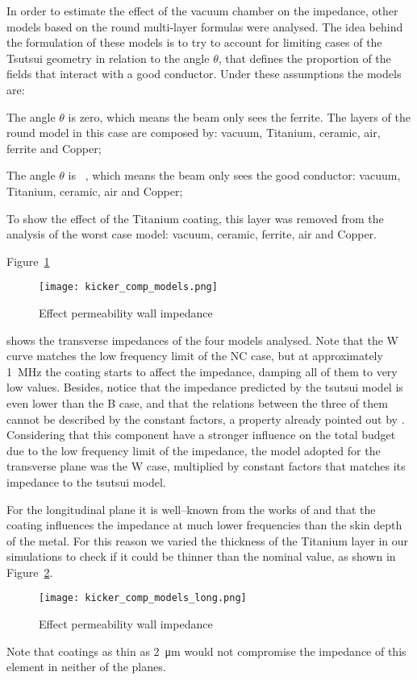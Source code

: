     In order to estimate the effect of the vacuum chamber on the impedance, other models based on the round multi-layer formulas were analysed. The idea behind the formulation of these models is to try to account for limiting cases of the Tsutsui geometry in relation to the angle $\theta$, that defines the proportion of the fields that interact with a good conductor. Under these assumptions the models are:
    \begin{description}[align=left]
        \item[Worst case (W):] The angle $\theta$ is zero, which means the beam only sees the ferrite. The layers of the round model in this case are composed by: vacuum, Titanium, ceramic, air, ferrite and Copper;
        \item[Best case (B):] The angle $\theta$ is \si{\pi{}}, which means the beam only sees the good conductor: vacuum, Titanium, ceramic, air and Copper;
        \item[No Coating (NC):] To show the effect of the Titanium coating, this layer was removed from the analysis of the worst case model: vacuum, ceramic, ferrite, air and Copper.
    \end{description}
    Figure~\ref{fig:uncoupled_flux_impedance}
    \begin{figure}[t]
        \centering
        \texttt{[image: kicker\_comp\_models.png]}
        \caption{Effect permeability wall impedance}
        \label{fig:uncoupled_flux_impedance}
    \end{figure}
    shows the transverse impedances of the four models analysed. Note that the W curve matches the low frequency limit of the NC case, but at approximately \SI{1}{\mega\hertz} the coating starts to affect the impedance, damping all of them to very low values. Besides, notice that the impedance predicted by the tsutsui model is even lower than the B case, and that the relations between the three of them cannot be described by the constant  factors, a property already pointed out by . Considering that this component have a stronger influence on the total budget due to the low frequency limit of the impedance, the model adopted for the transverse plane was the W case, multiplied by constant factors that matches its impedance to the tsutsui model.

    For the longitudinal plane it is well--known from the works of  and  that the coating influences the impedance at much lower frequencies than the skin depth of the metal. For this reason we varied the thickness of the Titanium layer in our simulations to check if it could be thinner than the nominal value, as shown in Figure~\ref{fig:kicker_comp_models_long}.
    \begin{figure}[t]
        \centering
        \texttt{[image: kicker\_comp\_models\_long.png]}
        \caption{Effect permeability wall impedance}
        \label{fig:kicker_comp_models_long}
    \end{figure}
    Note that coatings as thin as \SI{2}{\micro\meter} would not compromise the impedance of this element in neither of the planes.

